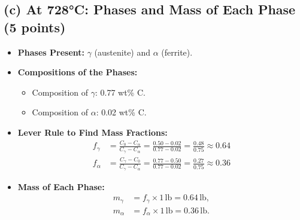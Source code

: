 \documentclass[11pt]{article}
\begin{document}
\subsection*{(c) At 728°C: Phases and Mass of Each Phase (5 points)}
\begin{itemize}
    \item \textbf{Phases Present:} \(\gamma\) (austenite) and \(\alpha\) (ferrite).
    \item \textbf{Compositions of the Phases:}
    \begin{itemize}
        \item Composition of \(\gamma\): 0.77 wt\% C.
        \item Composition of \(\alpha\): 0.02 wt\% C.
    \end{itemize}
    \item \textbf{Lever Rule to Find Mass Fractions:}
    \begin{align*}
        f_\gamma &= \frac{C_0 - C_\alpha}{C_\gamma - C_\alpha} = \frac{0.50 - 0.02}{0.77 - 0.02} = \frac{0.48}{0.75} \approx 0.64 \\
        f_\alpha &= \frac{C_\gamma - C_0}{C_\gamma - C_\alpha} = \frac{0.77 - 0.50}{0.77 - 0.02} = \frac{0.27}{0.75} \approx 0.36
    \end{align*}
    \item \textbf{Mass of Each Phase:}
    \begin{align*}
        m_\gamma &= f_\gamma \times 1 \, \text{lb} = 0.64 \, \text{lb}, \\
        m_\alpha &= f_\alpha \times 1 \, \text{lb} = 0.36 \, \text{lb}.
    \end{align*}
\end{itemize}
\end{document}
